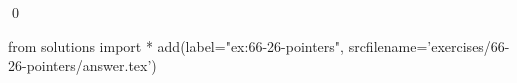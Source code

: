 
\begin{ex}
  \label{ex:66-26-pointers}
  
  \qed
\end{ex}
\begin{python0}
from solutions import *
add(label="ex:66-26-pointers",
    srcfilename='exercises/66-26-pointers/answer.tex')
\end{python0}

